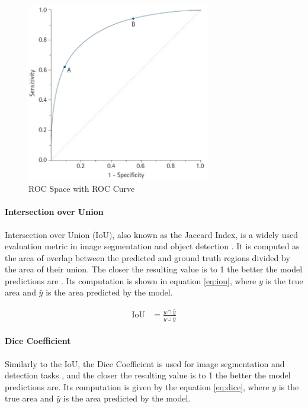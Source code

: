 \begin{figure}[H]
\begin{centering}
\includegraphics[width=8cm]{assets/images/roc-space.jpg}
\par\end{centering}
\caption{ROC Space with ROC Curve \cite{Nahm2022}}
\label{fig:roc}
\end{figure}

\paragraph{Intersection over Union} Intersection over Union (IoU), also known as the Jaccard Index, is a widely used evaluation metric in image segmentation and object detection \cite{Rezatofighi2019}. It is computed as the area of overlap between the predicted and ground truth regions divided by the area of their union. The closer the resulting value is to 1 the better the model predictions are \cite{Rezatofighi2019}. Its computation is shown in equation \ref{eq:iou}, where $y$ is the true area and $\hat{y}$ is the area predicted by the model.

\begin{align}
\label{eq:iou}
\text{IoU} &= \frac{y \cap \hat{y}}{y \cup \hat{y}}
\end{align}

\paragraph{Dice Coefficient} Similarly to the IoU, the Dice Coefficient is used for image segmentation and detection tasks \cite{Hu2023}, and the closer the resulting value is to 1 the better the model predictions are. Its computation is given by the equation \ref{eq:dice}, where $y$ is the true area and $\hat{y}$ is the area predicted by the model.

